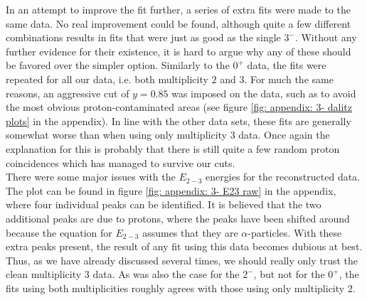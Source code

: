In an attempt to improve the fit further, a series of extra fits were made to the same data. No real improvement could be found, although quite a few different combinations results in fits that were just as good as the single $3^-$. Without any further evidence for their existence, it is hard to argue why any of these should be favored over the simpler option. Similarly to the $0^+$ data, the fits were repeated for all our data, i.e. both multiplicity $2$ and $3$. For much the same reasons, an aggressive cut of $y=0.85$ was imposed on the data, such as to avoid the most obvious proton-contaminated areas (see figure \ref{fig: appendix: 3- dalitz plots} in the appendix). In line with the other data sets, these fits are generally somewhat worse than when using only multiplicity $3$ data. Once again the explanation for this is probably that there is still quite a few random proton coincidences which has managed to survive our cuts. \\

There were some major issues with the $E_{2-3}$ energies for the reconstructed data. The plot can be found in figure \ref{fig: appendix: 3- E23 raw} in the appendix, where four individual peaks can be identified. It is believed that the two additional peaks are due to protons, where the peaks have been shifted around because the equation for $E_{2-3}$ assumes that they are $\alpha$-particles. With these extra peaks present, the result of any fit using this data becomes dubious at best. Thus, as we have already discussed several times, we should really only trust the clean multiplicity $3$ data. As was also the case for the $2^-$, but not for the $0^+$, the fits using both multiplicities roughly agrees with those using only multiplicity $2$. 

